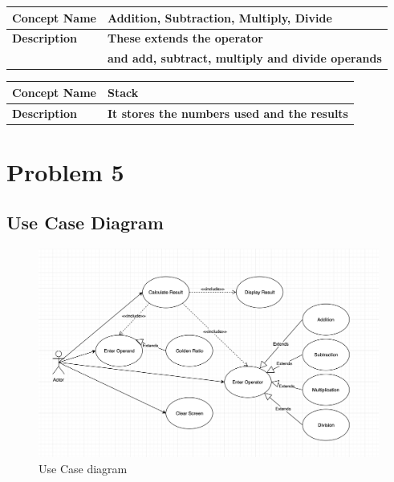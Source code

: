 \documentclass[12pt]{extarticle}
\begin{document}
\begin{table}[h]
\centering
\begin{tabular}{|l|l|}
\hline
\textbf{Concept Name} & \textbf{Addition, Subtraction, Multiply, Divide} \\
\hline

\textbf{Description} & \textbf{These extends the operator}\\
& \textbf{and add, subtract, multiply and divide operands}\\

\hline
\end{tabular}
\end{table}


\begin{table}[h]
\centering
\begin{tabular}{|l|l|}
\hline
\textbf{Concept Name} & \textbf{Stack} \\
\hline

\textbf{Description} & \textbf{It stores the numbers used and  the results}\\

\hline
\end{tabular}
\end{table}


\newpage
\section{Problem 5}
\subsection{Use Case Diagram}
\begin{figure}[htb!]
  \includegraphics[width=1\textwidth]{Usecase.png}
  \centering
  \caption{Use Case diagram}
\end{figure}
\end{document}
